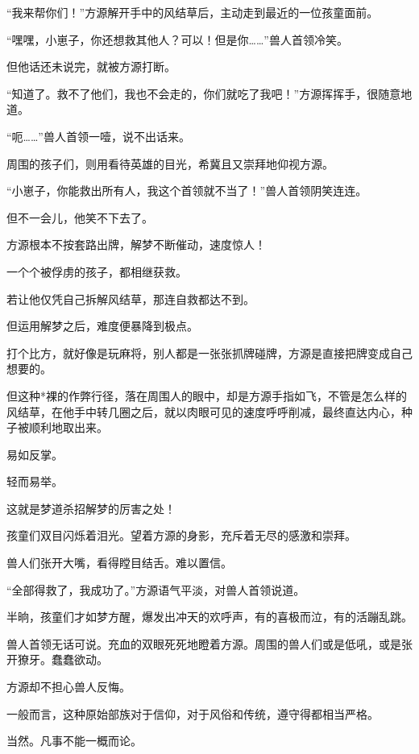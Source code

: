 
\begin{this_body}

“我来帮你们！”方源解开手中的风结草后，主动走到最近的一位孩童面前。

“嘿嘿，小崽子，你还想救其他人？可以！但是你……”兽人首领冷笑。

但他话还未说完，就被方源打断。

“知道了。救不了他们，我也不会走的，你们就吃了我吧！”方源挥挥手，很随意地道。

“呃……”兽人首领一噎，说不出话来。

周围的孩子们，则用看待英雄的目光，希冀且又崇拜地仰视方源。

“小崽子，你能救出所有人，我这个首领就不当了！”兽人首领阴笑连连。

但不一会儿，他笑不下去了。

方源根本不按套路出牌，解梦不断催动，速度惊人！

一个个被俘虏的孩子，都相继获救。

若让他仅凭自己拆解风结草，那连自救都达不到。

但运用解梦之后，难度便暴降到极点。

打个比方，就好像是玩麻将，别人都是一张张抓牌碰牌，方源是直接把牌变成自己想要的。

但这种*裸的作弊行径，落在周围人的眼中，却是方源手指如飞，不管是怎么样的风结草，在他手中转几圈之后，就以肉眼可见的速度呼呼削减，最终直达内心，种子被顺利地取出来。

易如反掌。

轻而易举。

这就是梦道杀招解梦的厉害之处！

孩童们双目闪烁着泪光。望着方源的身影，充斥着无尽的感激和崇拜。

兽人们张开大嘴，看得瞠目结舌。难以置信。

“全部得救了，我成功了。”方源语气平淡，对兽人首领说道。

半晌，孩童们才如梦方醒，爆发出冲天的欢呼声，有的喜极而泣，有的活蹦乱跳。

兽人首领无话可说。充血的双眼死死地瞪着方源。周围的兽人们或是低吼，或是张开獠牙。蠢蠢欲动。

方源却不担心兽人反悔。

一般而言，这种原始部族对于信仰，对于风俗和传统，遵守得都相当严格。

当然。凡事不能一概而论。


\end{this_body}
